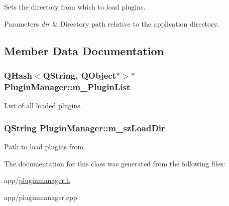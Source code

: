 Sets the directory from which to load plugins. 


\begin{DoxyParams}{Parameters}
{\em dir} & Directory path relative to the application directory. \\
\hline
\end{DoxyParams}


\subsection{Member Data Documentation}
\hypertarget{class_plugin_manager_af65cae6069dfdb469aee42c4d2ec94d2}{
\subsubsection[{m\-\_\-\-Plugin\-List}]{\setlength{\rightskip}{0pt plus 5cm}Q\-Hash$<$Q\-String, Q\-Object$\ast$$>$$\ast$ Plugin\-Manager\-::m\-\_\-\-Plugin\-List\hspace{0.3cm}{\ttfamily [protected]}}}\label{class_plugin_manager_af65cae6069dfdb469aee42c4d2ec94d2}
List of all loaded plugins. \hypertarget{class_plugin_manager_ad76c45e41d41eac52be4ba19e4ae11fb}{
\subsubsection[{m\-\_\-sz\-Load\-Dir}]{\setlength{\rightskip}{0pt plus 5cm}Q\-String Plugin\-Manager\-::m\-\_\-sz\-Load\-Dir\hspace{0.3cm}{\ttfamily [protected]}}}\label{class_plugin_manager_ad76c45e41d41eac52be4ba19e4ae11fb}
Path to load plugins from. 

The documentation for this class was generated from the following files\-:\begin{DoxyCompactItemize}
\item 
app/\hyperlink{pluginmanager_8h}{pluginmanager.\-h}\item 
app/pluginmanager.\-cpp\end{DoxyCompactItemize}
